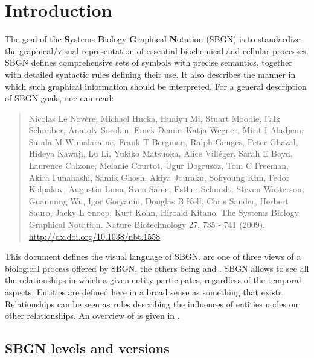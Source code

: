 
\chapter{Introduction}

The goal of the \textbf{S}ystems \textbf{B}iology \textbf{G}raphical \textbf{N}otation (SBGN) is to standardize the graphical/visual representation of essential biochemical and cellular processes. SBGN defines comprehensive sets of symbols with precise semantics, together with detailed syntactic rules defining their use.  It also describes the manner in which such graphical information should be interpreted. For a general description of SBGN goals, one can read:

\begin{quote}
 Nicolas Le Nov\`{e}re, Michael Hucka, Huaiyu Mi, Stuart Moodie, Falk Schreiber, Anatoly Sorokin, Emek Demir, Katja Wegner, Mirit I Aladjem, Sarala M Wimalaratne, Frank T Bergman, Ralph Gauges, Peter Ghazal, Hideya Kawaji, Lu Li, Yukiko Matsuoka, Alice Villéger, Sarah E Boyd, Laurence Calzone, Melanie Courtot, Ugur Dogrusoz, Tom C Freeman, Akira Funahashi, Samik Ghosh, Akiya Jouraku, Sohyoung Kim, Fedor Kolpakov, Augustin Luna, Sven Sahle, Esther Schmidt, Steven Watterson, Guanming Wu, Igor Goryanin, Douglas B Kell, Chris Sander, Herbert Sauro, Jacky L Snoep, Kurt Kohn, Hiroaki Kitano. The Systems Biology Graphical Notation. Nature Biotechnology 27, 735 - 741 (2009).  \url{http://dx.doi.org/10.1038/nbt.1558}
\end{quote}

This document defines the \emph{\ER{}} visual language of SBGN. \ERs are one of three views of a biological process offered by SBGN, the others being \PDs and \AFs. SBGN \ERl{} allows to see all the relationships in which a given entity participates, regardless of the temporal aspects. Entities are defined here in a broad sense as something that exists. Relationships can be seen as rules describing the influences of entities nodes on other relationships. An overview of \ERs is given in .

\section{SBGN levels and versions}
\label{sec:sbgn-levels}

